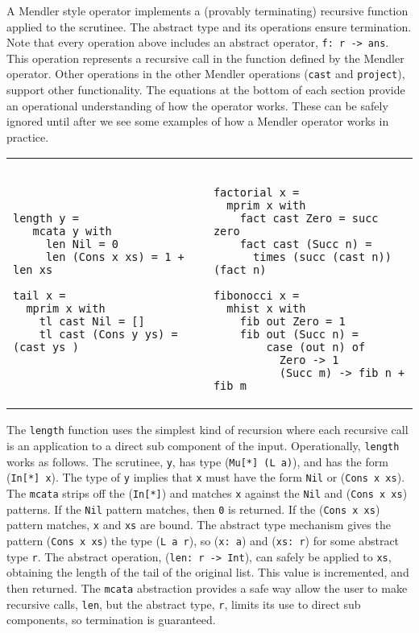 A Mendler style operator implements a (provably terminating) recursive function
applied to the scrutinee. The abstract type and its operations ensure termination.
Note that every operation above includes an abstract operator, \verb+f: r -> ans+. 
This operation represents a recursive call in the function defined by the Mendler
operator. Other operations in the other Mendler operations (\verb+cast+ and \verb+project+), support other functionality. The equations
at the bottom of each section provide an operational
understanding of how the operator works. These can be safely ignored until after
we see some examples of how a Mendler operator works in practice.

\vspace*{.1in}
\begin{tabular}{l|l}
\begin{minipage}[l]{.42\linewidth}
{\small
\begin{verbatim}
length y = 
   mcata y with
     len Nil = 0
     len (Cons x xs) = 1 + len xs

tail x = 
  mprim x with
    tl cast Nil = []
    tl cast (Cons y ys) = (cast ys )
\end{verbatim}}
\end{minipage}

& 

\begin{minipage}[l]{.50\linewidth}
{\small
\begin{verbatim}

factorial x =
  mprim x with
    fact cast Zero = succ zero
    fact cast (Succ n) = 
      times (succ (cast n)) (fact n)
                      
fibonocci x =
  mhist x with
    fib out Zero = 1
    fib out (Succ n) = 
        case (out n) of
          Zero -> 1
          (Succ m) -> fib n + fib m 
\end{verbatim}}
\end{minipage}
\end{tabular}
\vspace*{.1in}

The \verb+length+ function uses the simplest kind of recursion where
each recursive call is an application to a direct sub component of the input.
Operationally, \verb+length+ works as follows. The scrutinee, \verb+y+,
has type (\verb+Mu[*] (L a)+), and has the form (\verb+In[*] x+). 
The type of \verb+y+ implies that \verb+x+ must have the form \verb+Nil+ or
(\verb+Cons x xs+).  The  \verb+mcata+ strips off the (\verb+In[*]+) and matches \verb+x+ against
the \verb+Nil+ and (\verb+Cons x xs+) patterns. If the \verb+Nil+ pattern
matches, then \verb+0+ is returned. If the (\verb+Cons x xs+) pattern matches,
\verb+x+ and \verb+xs+ are bound. The abstract type mechanism gives the
pattern (\verb+Cons x xs+) the type (\verb+L a r+), so (\verb+x: a+) and
(\verb+xs: r+) for some abstract type \verb+r+. The abstract operation,
(\verb+len: r -> Int+), can safely be applied to \verb+xs+,
obtaining the length of the tail of the original list. This value
is incremented, and then returned. The \verb+mcata+ abstraction provides a safe way
allow the user to make recursive calls, \verb+len+, but the abstract type, \verb+r+,
limits its use to direct sub components, so termination is guaranteed.

